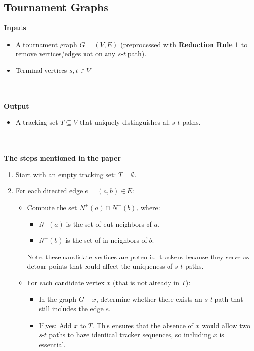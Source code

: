 \documentclass{article}
\begin{document}
\subsection{Tournament Graphs}
\textbf{Inputs}
\begin{itemize}
    \item A tournament graph \( G = (V, E) \) (preprocessed with \textbf{Reduction Rule 1} to remove vertices/edges not on any \( s \)-\( t \) path).
    \item Terminal vertices \( s, t \in V \) 
\end{itemize}
\\ \\
\textbf{Output}
\begin{itemize}
    \item A tracking set \( T \subseteq V \) that uniquely distinguishes all \( s \)-\( t \) paths.
\end{itemize}
\\ \\
\textbf{The steps mentioned in the paper}

\begin{enumerate}
    \item Start with an empty tracking set: \( T = \emptyset \).
    
    \item For each directed edge \( e = (a, b) \in E \):
        \begin{itemize}
            \item Compute the set \( N^+(a) \cap N^-(b) \), where:
            \begin{itemize}
                \item \( N^+(a) \) is the set of out-neighbors of \( a \).
                \item \( N^-(b) \) is the set of in-neighbors of \( b \).
            \end{itemize}
            Note: these candidate vertices are potential trackers because they serve as detour points that could affect the uniqueness of \( s \)-\( t \) paths.
            
            \item For each candidate vertex \( x \) (that is not already in \( T \)):
            \begin{itemize}
                \item In the graph \( G - x \), determine whether there exists an \( s \)-\( t \) path that still includes the edge \( e \).
                \item If yes: Add \( x \) to \( T \). This ensures that the absence of \( x \) would allow two \( s \)-\( t \) paths to have identical tracker sequences, so including \( x \) is essential.
            \end{itemize}
    \end{itemize}
\end{enumerate}
    
\end{document}
